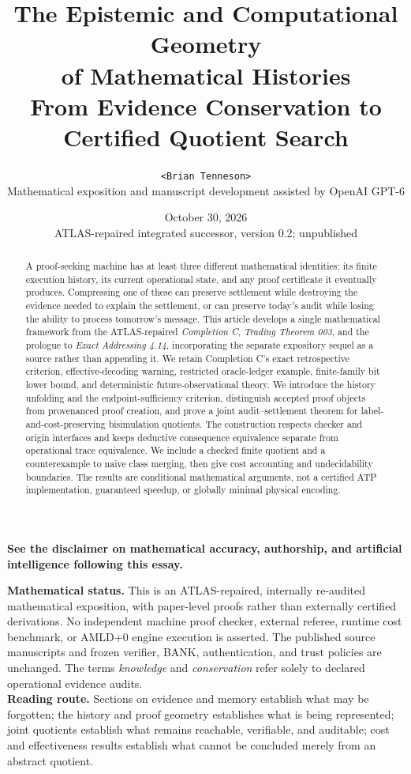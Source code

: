 \documentclass[11pt,letterpaper]{article}
\title{\bfseries The Epistemic and Computational Geometry\\[4pt]
 of Mathematical Histories\\[5pt]
\large From Evidence Conservation to Certified Quotient Search}
\author{\texttt{<Brian Tenneson>}\\\small Mathematical exposition and manuscript development assisted by OpenAI GPT-6}
\date{October 30, 2026\\\small ATLAS-repaired integrated successor, version 0.2; unpublished}
\theoremstyle{definition}
\begin{document}
\maketitle
\begin{center}
\small\bfseries See the disclaimer on mathematical accuracy, authorship, and artificial intelligence following this essay.
\end{center}
\begin{abstract}
A proof-seeking machine has at least three different mathematical identities: its finite execution history, its current operational state, and any proof certificate it eventually produces. Compressing one of these can preserve settlement while destroying the evidence needed to explain the settlement, or can preserve today's audit while losing the ability to process tomorrow's message. This article develops a single mathematical framework from the ATLAS-repaired \emph{Completion C}, \emph{Trading Theorem 003}, and the prologue to \emph{Exact Addressing 4.14}, incorporating the separate expository sequel as a source rather than appending it. We retain Completion C's exact retrospective criterion, effective-decoding warning, restricted oracle-ledger example, finite-family bit lower bound, and deterministic future-observational theory. We introduce the history unfolding and the endpoint-sufficiency criterion, distinguish accepted proof objects from provenanced proof creation, and prove a joint audit--settlement theorem for label-and-cost-preserving bisimulation quotients. The construction respects checker and origin interfaces and keeps deductive consequence equivalence separate from operational trace equivalence. We include a checked finite quotient and a counterexample to naive class merging, then give cost accounting and undecidability boundaries. The results are conditional mathematical arguments, not a certified ATP implementation, guaranteed speedup, or globally minimal physical encoding.
\end{abstract}
\noindent\textbf{Mathematical status.} This is an ATLAS-repaired, internally re-audited mathematical exposition, with paper-level proofs rather than externally certified derivations. No independent machine proof checker, external referee, runtime cost benchmark, or AMLD+0 engine execution is asserted. The published source manuscripts and frozen verifier, BANK, authentication, and trust policies are unchanged. The terms \emph{knowledge} and \emph{conservation} refer solely to declared operational evidence audits.\\[3pt]
\noindent\textbf{Reading route.} Sections on evidence and memory establish what may be forgotten; the history and proof geometry establishes what is being represented; joint quotients establish what remains reachable, verifiable, and auditable; cost and effectiveness results establish what cannot be concluded merely from an abstract quotient.
\tableofcontents
\end{document}
